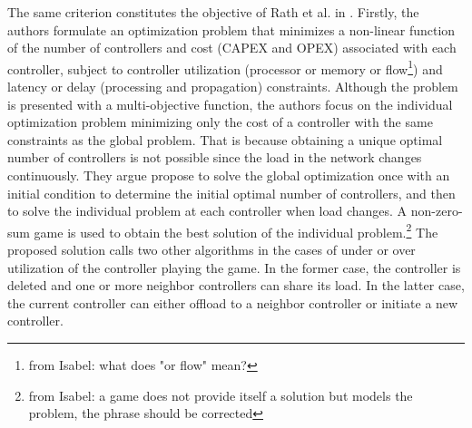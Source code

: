 \documentclass{IEEEtran}
\newcommand\fia[1]{{\color{red}\footnote{\color{red}from Isabel: #1}}} %
\newcommand\mia[1]{{\color{red}#1}}%
\newcommand\delia[1]{{\tiny{\color{red}#1}}} %
\begin{document}
The same criterion constitutes the objective of Rath et al. in \cite{RaRe14}. Firstly, the authors formulate an optimization problem that minimizes a non-linear function of the number of controllers and cost (CAPEX and OPEX) associated with each controller, subject to controller utilization (processor or memory or flow\fia{what does "or flow" mean?}) and latency or delay (processing and propagation) constraints. Although the problem is presented with a multi-objective function, the authors focus on the individual optimization problem minimizing only the cost of a controller with the same constraints as the global problem. That is because obtaining a unique optimal number of controllers is not possible since the load in the network changes continuously. They \delia{argue} \mia{propose} to solve the global optimization once with an initial condition to determine the initial optimal number of controllers, and then to solve the individual problem at each controller when load changes. A non-zero-sum game is used to obtain the best solution of the individual problem.\fia{a game does not provide itself a solution but models the problem, the phrase should be corrected} The proposed solution calls two other algorithms in the cases of under or over utilization of the controller playing the game. In the former case, the controller is deleted and one or more neighbor controllers can share its load. In the latter case, the current controller can either offload to a neighbor controller or initiate a new controller. %
\end{document}
